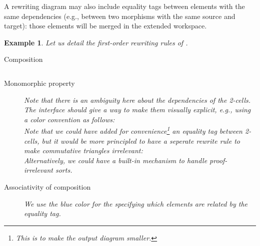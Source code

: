 \documentclass{article}
\newtheorem{example}{Example}[section]
\begin{document}
A rewriting diagram may also include equality tags between elements with the same dependencies (e.g., between two morphisms with the same source and target): those elements will be merged in the extended workspace.
\begin{example}
    Let us detail the first-order rewriting rules of .

    \begin{description}
        \item[Composition] 
   
\begin{equation}

\label{eq:rew-comp}
\tag{Comp}
\end{equation}

\item[Monomorphic property]
\begin{equation}

\tag{Mono}
\label{eq:rew-mono-fo}
\end{equation}
Note that there is an ambiguity here about the dependencies of the 2-cells. The interface should give a way to make them visually explicit, e.g., using a color convention as follows:
\[

\]
Note that we could have added for convenience\footnote{This is to make the output diagram smaller.} an equality tag between 2-cells, 
but it would be more principled 
to have a seperate rewrite rule  to make commutative triangles irrelevant:
\[

\]
Alternatively, we could have a built-in mechanism to handle proof-irrelevant sorts.
\item[Associativity of composition]
We use the blue color for the specifying which elements 
are related by the equality tag.
\begin{equation}
    
    \label{eq:rew-assoc}
    \tag{Assoc}
    \end{equation}
% 
% 
\end{description}
\end{example}
\end{document}
